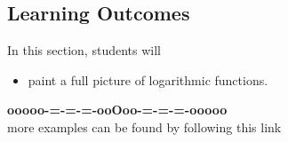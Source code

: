 \documentclass{ximera}
\begin{document}
\subsection*{Learning Outcomes}


\begin{sectionOutcomes}
In this section, students will 

\begin{itemize}
\item paint a full picture of logarithmic functions.
\end{itemize}
\end{sectionOutcomes}













\begin{center}
\textbf{\textcolor{green!50!black}{ooooo-=-=-=-ooOoo-=-=-=-ooooo}} \\

more examples can be found by following this link\\ 

\end{center}
\end{document}
